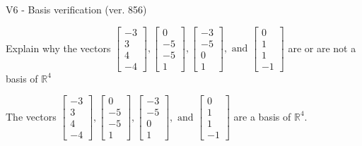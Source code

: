 \begin{exercise}
  \begin{exerciseTitle}V6 - Basis verification (ver. 856)\end{exerciseTitle}
  \begin{exerciseStatement}
    Explain why the vectors \(\left[\begin{array}{r}
-3 \\
3 \\
4 \\
-4
\end{array}\right] , \left[\begin{array}{r}
0 \\
-5 \\
-5 \\
1
\end{array}\right] , \left[\begin{array}{r}
-3 \\
-5 \\
0 \\
1
\end{array}\right] , \text{ and } \left[\begin{array}{r}
0 \\
1 \\
1 \\
-1
\end{array}\right]\) are or are not a basis of \(\mathbb{R}^4\)	


  \end{exerciseStatement}
  \begin{exerciseAnswer}
   The vectors \(\left[\begin{array}{r}
-3 \\
3 \\
4 \\
-4
\end{array}\right] , \left[\begin{array}{r}
0 \\
-5 \\
-5 \\
1
\end{array}\right] , \left[\begin{array}{r}
-3 \\
-5 \\
0 \\
1
\end{array}\right] , \text{ and } \left[\begin{array}{r}
0 \\
1 \\
1 \\
-1
\end{array}\right]\) 
  	 are  a basis of \(\mathbb{R}^4\).
  


  \end{exerciseAnswer}
\end{exercise}